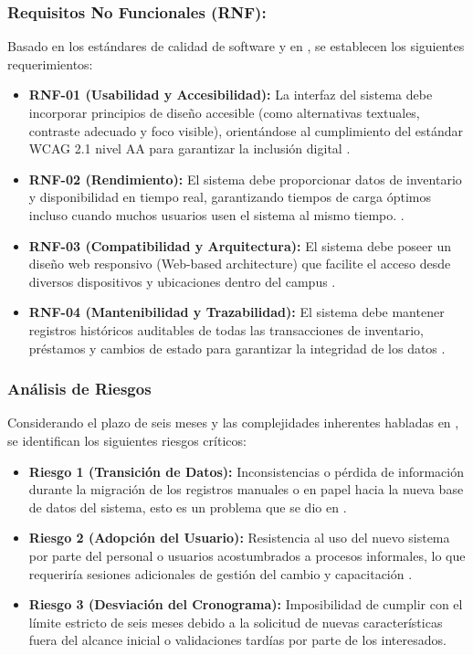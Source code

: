 \documentclass[pdflatex,sn-mathphys-num]{sn-jnl}%
\theoremstyle{thmstyleone}%
\theoremstyle{thmstyletwo}%
\theoremstyle{thmstylethree}%
\begin{document}
\subsubsection{Requisitos No Funcionales (RNF):}
Basado en los estándares de calidad de software y en \cite{alvarez-pineda_implementacion_2026, purnamasari_rapid_2026}, se establecen los siguientes requerimientos:
\begin{itemize}
	\item \textbf{RNF-01 (Usabilidad y Accesibilidad):} La interfaz del sistema debe incorporar principios de diseño accesible (como alternativas textuales, contraste adecuado y foco visible), orientándose al cumplimiento del estándar WCAG 2.1 nivel AA para garantizar la inclusión digital \cite{alvarez-pineda_implementacion_2026}.
	\item \textbf{RNF-02 (Rendimiento):} El sistema debe proporcionar datos de inventario y disponibilidad en tiempo real, garantizando tiempos de carga óptimos incluso cuando muchos usuarios usen el sistema al mismo tiempo. \cite{purnamasari_rapid_2026}.
	\item \textbf{RNF-03 (Compatibilidad y Arquitectura):} El sistema debe poseer un diseño web responsivo (Web-based architecture) que facilite el acceso desde diversos dispositivos y ubicaciones dentro del campus \cite{purnamasari_rapid_2026}.
	\item \textbf{RNF-04 (Mantenibilidad y Trazabilidad):} El sistema debe mantener registros históricos auditables de todas las transacciones de inventario, préstamos y cambios de estado para garantizar la integridad de los datos \cite{purnamasari_rapid_2026}.
\end{itemize}

 \subsubsection{Análisis de Riesgos}
 Considerando el plazo de seis meses y las complejidades inherentes habladas en  \cite{alvarez-pineda_implementacion_2026}, se identifican los siguientes riesgos críticos:
 \begin{itemize}
 	\item \textbf{Riesgo 1 (Transición de Datos):} Inconsistencias o pérdida de información durante la migración de los registros manuales o en papel hacia la nueva base de datos del sistema, esto es un problema que se dio en \cite[p.~345]{alvarez-pineda_implementacion_2026}.
 	\item \textbf{Riesgo 2 (Adopción del Usuario):} Resistencia al uso del nuevo sistema por parte del personal o usuarios acostumbrados a procesos informales, lo que requeriría sesiones adicionales de gestión del cambio y capacitación \cite[p.~345]{alvarez-pineda_implementacion_2026}.
 	\item \textbf{Riesgo 3 (Desviación del Cronograma):} Imposibilidad de cumplir con el límite estricto de seis meses debido a la solicitud de nuevas características fuera del alcance inicial o validaciones tardías por parte de los interesados.
 \end{itemize}
\end{document}
